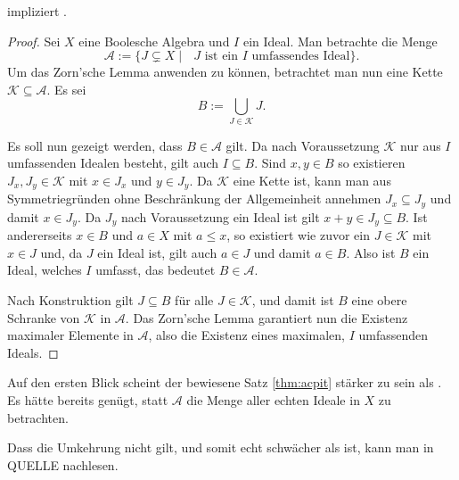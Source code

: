 \begin{thm}
  \label{thm:acpit}
  \AC impliziert \PIT.
\end{thm}

\begin{proof}
  Sei $X$ eine Boolesche Algebra und $I$ ein Ideal. 
  Man betrachte die Menge
  \begin{displaymath}
    \mathcal{A} := \{J \subsetneq X \mid \text{ $J$ ist ein $I$ umfassendes Ideal} \}.
  \end{displaymath}
  Um das Zorn'sche Lemma anwenden zu können, betrachtet man nun eine Kette $\mathcal{K} \subseteq \mathcal{A}$.
  Es sei 
  \begin{displaymath}
    B := \bigcup_{J \in \mathcal{K}} J.
  \end{displaymath}

  Es soll nun gezeigt werden, dass $B \in \mathcal{A}$ gilt.
  Da nach Voraussetzung $\mathcal{K}$ nur aus $I$ umfassenden Idealen besteht, gilt auch $I \subseteq B$.
  Sind $x,y \in B$ so existieren $J_x, J_y \in \mathcal{K}$ mit $x \in J_x$ und $y \in J_y$.
  Da $\mathcal{K}$ eine Kette ist, kann man aus Symmetriegründen ohne Beschränkung der Allgemeinheit annehmen $J_x \subseteq J_y$ und damit $x \in J_y$.
  Da $J_y$ nach Voraussetzung ein Ideal ist gilt $x + y \in J_y \subseteq B$.
  Ist andererseits $x \in B$ und $a \in X$ mit $a \leq x$, so existiert wie zuvor ein $J \in \mathcal{K}$ mit $x \in J$ und, da $J$ ein Ideal ist, gilt auch $a \in J$ und damit $a \in B$.
  Also ist $B$ ein Ideal, welches $I$ umfasst, das bedeutet $B \in \mathcal{A}$.

  Nach Konstruktion gilt $J \subseteq B$ für alle $J \in \mathcal{K}$, und damit ist $B$ eine obere Schranke von $\mathcal{K}$ in $\mathcal{A}$.
  Das Zorn'sche Lemma garantiert nun die Existenz maximaler Elemente in $\mathcal{A}$, also die Existenz eines maximalen, $I$ umfassenden Ideals.
\end{proof}

Auf den ersten Blick scheint der bewiesene Satz \ref{thm:acpit} stärker zu sein als \PIT. Es hätte bereits genügt, statt $\mathcal{A}$ die Menge aller echten Ideale in $X$ zu betrachten.

Dass die Umkehrung nicht gilt, und somit \PIT echt schwächer als \AC ist, kann man in QUELLE nachlesen.

